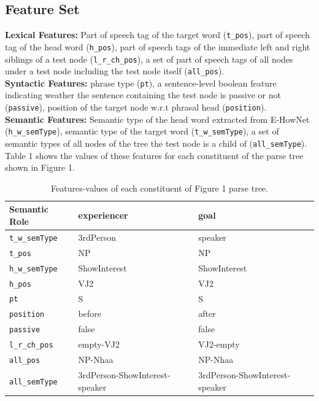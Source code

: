 \documentclass[11pt]{article}
\begin{document}
\subsection{Feature Set}
\textbf{Lexical Features:} Part of speech tag of the target word (\verb+t_pos+), part of speech tag of the head word (\verb+h_pos+), part of speech tags of the immediate left and right siblings of a test node (\verb+l_r_ch_pos+),  a set of part of speech tags of all nodes under a test node including the test node itself (\verb+all_pos+).\\[0.2cm]
\textbf{Syntactic Features:} phrase type (\verb+pt+), a sentence-level boolean feature indicating weather the sentence containing the test node is passive or not (\verb+passive+), position of the target node w.r.t phrasal head (\verb+position+).\\[0.2cm]
\textbf{Semantic Features:} Semantic type of the head word extracted from E-HowNet (\verb+h_w_semType+), semantic type of the target word (\verb+t_w_semType+), a set of semantic types of all nodes of the tree the test node is a child of (\verb+all_semType+). \\[0.2cm]
Table 1 shows the values of these features for each constituent of the parse tree shown in Figure 1.
\begin{table}[!h]
\small
\begin{center}
\begin{tabular}{|p{2cm}|p{2cm}|p{2cm}|}
\hline \textbf{Semantic Role} & experiencer & goal \\ \hline
 \verb+t_w_semType+ & 3rdPerson  & speaker \\
 \verb+t_pos+ & NP &  NP \\ 
 \verb+h_w_semType+ &  ShowInterest & ShowInterest \\ 
 \verb+h_pos+ & VJ2 & VJ2 \\ 
 \verb+pt+ & S & S \\ 
 \verb+position+ & before & after \\ 
 \verb+passive+ & false & false \\ 
 \verb+l_r_ch_pos+ & empty-VJ2 & VJ2-empty\\ 
 \verb+all_pos+ & NP-Nhaa  & NP-Nhaa\\ 
 \verb+all_semType+ & 3rdPerson-ShowInterest-speaker  &  3rdPerson-ShowInterest-speaker\\ 
\hline 
\end{tabular}
\caption{Features-values of each constituent of Figure 1 parse tree.}
\end{center}
\normalsize 
\end{table}
\end{document}
